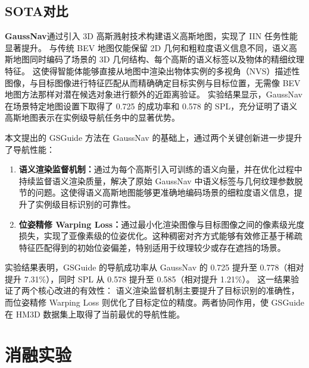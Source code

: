 \subsection{SOTA对比}
\textbf{GaussNav}\cite{gaussnav}通过引入 3D 高斯溅射技术构建语义高斯地图，实现了 IIN 任务性能显著提升。
与传统 BEV 地图仅能保留 2D 几何和粗粒度语义信息不同，语义高斯地图同时编码了场景的 3D 几何结构、每个高斯的语义标签以及物体的精细纹理特征。
这使得智能体能够直接从地图中渲染出物体实例的多视角（NVS）描述性图像，与目标图像进行特征匹配从而精确确定目标实例与目标位置，无需像 BEV 地图方法那样对潜在候选对象进行额外的近距离验证。
实验结果显示，GaussNav 在场景特定地图设置下取得了 0.725 的成功率和 0.578 的 SPL，充分证明了语义高斯地图表示在实例级导航任务中的显著优势。

本文提出的 GSGuide 方法在 GaussNav 的基础上，通过两个关键创新进一步提升了导航性能：
\begin{enumerate}
\item \textbf{语义渲染监督机制：}通过为每个高斯引入可训练的语义向量，并在优化过程中持续监督语义渲染质量，解决了原始 GaussNav 中语义标签与几何纹理参数脱节的问题。这使得语义高斯地图能够更准确地编码场景的细粒度语义信息，提升了实例级目标识别的可靠性。
\item \textbf{位姿精修 Warping Loss：}通过最小化渲染图像与目标图像之间的像素级光度损失，实现了亚像素级的位姿优化。这种稠密对齐方式能够有效修正基于稀疏特征匹配得到的初始位姿偏差，特别适用于纹理较少或存在遮挡的场景。
\end{enumerate}

实验结果表明，GSGuide 的导航成功率从 GaussNav 的 0.725 提升至 0.778（相对提升 7.31\%），同时 SPL 从 0.578 提升至 0.585（相对提升 1.21\%）。
这一结果验证了两个核心改进的有效性：
语义渲染监督机制主要提升了目标识别的准确性，而位姿精修 Warping Loss 则优化了目标定位的精度。两者协同作用，使 GSGuide 在 HM3D 数据集上取得了当前最优的导航性能。




\section{消融实验}
